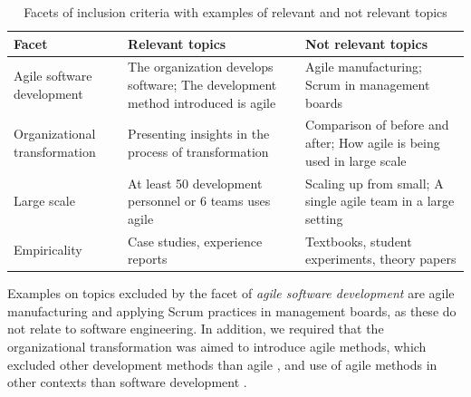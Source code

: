 \documentclass[preprint,authoryear,12pt]{elsarticle}
\begin{document}
\begin{table}
    \centering
    \begin{tabular}{ >{\raggedright\arraybackslash}p{}
                     >{\raggedright\arraybackslash}p{}
                     >{\raggedright\arraybackslash}p{} }
        \toprule
        Facet  &  Relevant topics  &  Not relevant topics  \\
        \midrule
        Agile software development  & 
                The organization develops software;
                The development method introduced is agile  & 
                
                Agile manufacturing;
                Scrum in management boards  \\
                
        Organizational transformation  &
                Presenting insights in the process of transformation  &
                
                Comparison of before and after;
                How agile is being used in large scale   \\
                
        Large scale    &
                At least 50 development personnel or 6 teams uses agile &
                
                Scaling up from small;
                A single agile team in a large setting \\
                
        Empiricality   &
                Case studies, experience reports  &
                
                Textbooks, student experiments, theory papers  \\
        \bottomrule
    \end{tabular}
    \caption{Facets of inclusion criteria with examples of relevant and
             not relevant topics}
    \label{table:facets}
\end{table}

Examples on topics excluded by the facet of \emph{agile software development}
are agile manufacturing and applying Scrum practices in management boards, as
these do not relate to software engineering. In addition, we required that the
organizational transformation was aimed to introduce agile methods, which
excluded other development methods than agile \cite{Sagesser2013}, and use of
agile methods in other contexts than software development \cite{Hodgkins2007}.
\end{document}
